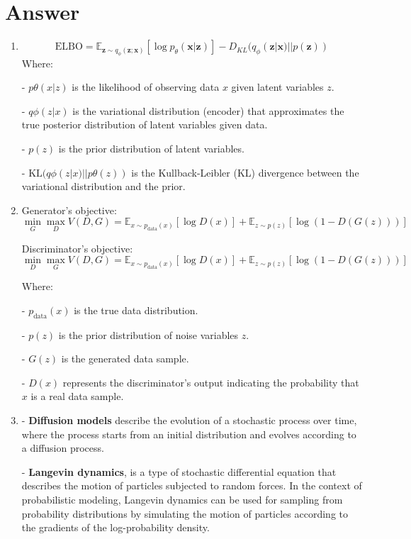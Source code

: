 \documentclass[
	12pt, %
]{fphw}
\begin{document}
\section*{Answer}
\begin{enumerate}
\item	\[ \text{ELBO} = \mathbb{E}_{\mathbf{z}\sim q_{\phi}(\mathbf{z};\mathbf{x})}[\log p_{\theta}(\mathbf{x}|\mathbf{z})]-D_{KL}(q_{\phi}(\mathbf{z}|\mathbf{x})||p(\mathbf{z})) \]
Where:

- $p{\theta}(x|z)$ is the likelihood of observing data $x$ given latent variables $z$.

- $q{\phi}(z|x)$ is the variational distribution (encoder) that approximates the true posterior distribution of latent variables given data.

- $p(z)$ is the prior distribution of latent variables.

- $\text{KL}(q{\phi}(z|x)||p{\theta}(z))$ is the Kullback-Leibler (KL) divergence between the variational distribution and the prior.

\item Generator's objective:
\[ \min_G \max_D V(D, G) = \mathbb{E}_{x \sim p_{\text{data}}(x)}[\log D(x)] + \mathbb{E}_{z \sim p(z)}[\log(1 - D(G(z)))] \]

Discriminator's objective:
\[ \min_D \max_G V(D, G) = \mathbb{E}_{x \sim p_{\text{data}}(x)}[\log D(x)] + \mathbb{E}_{z \sim p(z)}[\log(1 - D(G(z)))] \]

Where:

- $p_{\text{data}}(x)$ is the true data distribution.

- $p(z)$ is the prior distribution of noise variables $z$.

- $G(z)$ is the generated data sample.

- $D(x)$ represents the discriminator's output indicating the probability that $x$ is a real data sample.

\item- \textbf{Diffusion models} describe the evolution of a stochastic process over time, where the process starts from an initial distribution and evolves according to a diffusion process. 

- \textbf{Langevin dynamics},  is a type of stochastic differential equation that describes the motion of particles subjected to random forces. In the context of probabilistic modeling, Langevin dynamics can be used for sampling from probability distributions by simulating the motion of particles according to the gradients of the log-probability density.
\end{enumerate}
\end{document}
